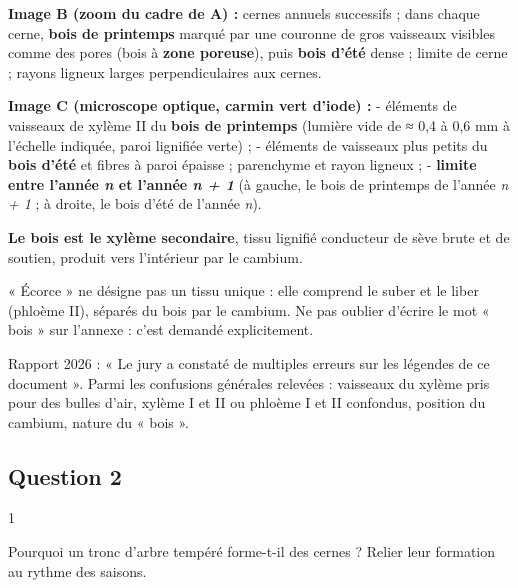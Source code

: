\documentclass[11pt,a4paper]{article}
\begin{document}
\textbf{Image B (zoom du cadre de A) :} cernes annuels successifs ; dans chaque cerne, \textbf{bois de printemps} marqué par une couronne de gros vaisseaux visibles comme des pores (bois à \textbf{zone poreuse}), puis \textbf{bois d'été} dense ; limite de cerne ; rayons ligneux larges perpendiculaires aux cernes.

\textbf{Image C (microscope optique, carmin vert d'iode) :}
- éléments de vaisseaux de xylème II du \textbf{bois de printemps} (lumière vide de ≈ 0,4 à 0,6 mm à l'échelle indiquée, paroi lignifiée verte) ;
- éléments de vaisseaux plus petits du \textbf{bois d'été} et fibres à paroi épaisse ; parenchyme et rayon ligneux ;
- \textbf{limite entre l'année \emph{n} et l'année \emph{n + 1}} (à gauche, le bois de printemps de l'année \emph{n + 1} ; à droite, le bois d'été de l'année \emph{n}).

\textbf{Le bois est le xylème secondaire}, tissu lignifié conducteur de sève brute et de soutien, produit vers l'intérieur par le cambium.

\begin{piege}

« Écorce » ne désigne pas un tissu unique : elle comprend le suber et le liber (phloème II), séparés du bois par le cambium. Ne pas oublier d'écrire le mot « bois » sur l'annexe : c'est demandé explicitement.

\end{piege}

\begin{jury}

Rapport 2026 : « Le jury a constaté de multiples erreurs sur les légendes de ce document ». Parmi les confusions générales relevées : vaisseaux du xylème pris pour des bulles d'air, xylème I et II ou phloème I et II confondus, position du cambium, nature du « bois ».

\end{jury}

\hypertarget{question-2}{%
\subsection{Question 2}\label{question-2}}

\begin{indication}{1}

Pourquoi un tronc d'arbre tempéré forme-t-il des cernes ? Relier leur formation au rythme des saisons.

\end{indication}
\end{document}
